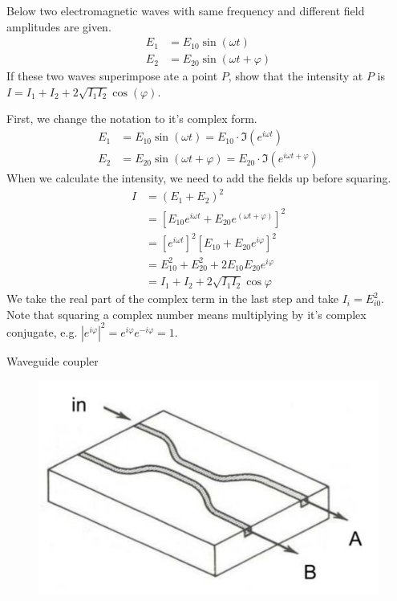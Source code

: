 \documentclass[answers, addpoints]{exam} %
\renewcommand{\phi}{\varphi}
\begin{document}
\begin{questions}
\question[10] Below two electromagnetic waves with same frequency and different field amplitudes are given.
\begin{align*}
	E_1 &= E_{10}\sin(\omega t) \\
	E_2 &= E_{20}\sin(\omega t + \phi)
\end{align*}
If these two waves superimpose ate a point $P$, show that the intensity at $P$ is $I = I_1 + I_2 + 2\sqrt{I_1I_2}\cos(\phi)$.
\begin{solution}
	First, we change the notation to it's complex form.
	\begin{align*}
		E_1 &= E_{10}\sin(\omega t)= E_{10}\cdot\Im{\left(e^{i\omega t}\right)} \\
		E_2 &= E_{20}\sin(\omega t + \phi) =E_{20}\cdot\Im{\left(e^{i\omega t + \phi}\right)}
	\end{align*}
	When we calculate the intensity, we need to add the fields up before squaring.
	\begin{align*}
		I &= (E_1+E_2)^2 \\
		&= \left[E_{10}e^{i\omega t} + E_{20}e^{(\omega t +\phi)}\right]^2 \\
		&= \left[e^{i\omega t}\right]^2 \left[E_{10}+E_{20}e^{i\phi}\right]^2 \\
		&= E_{10}^2+E_{20}^2+2E_{10}E_{20}e^{i\phi} \\
		&= I_1+I_2+2\sqrt{I_1I_2}\cos\phi
	\end{align*}
	We take the real part of the complex term in the last step and take $I_{i} = E_{i0}^2$.
	Note that squaring a complex number means multiplying by it's complex conjugate, e.g. $\left|e^{i\phi}\right|^2 = e^{i\phi}e^{-i\phi} = 1$.
\end{solution}

\question[10] Waveguide coupler
\begin{figure}[H]
	\centering
	\includegraphics[scale=1]{figures/coupler}
\end{figure}
\begin{parts}

\end{parts}
\end{questions}
\end{document}
